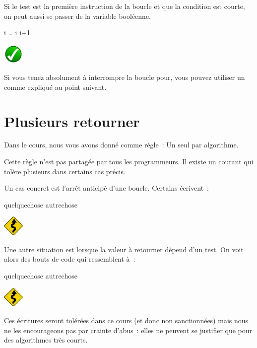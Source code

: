 	\bigskip
	\begin{minipage}{6cm}
	Si le test est la première instruction de la boucle
	et que la condition est courte,
	on peut aussi se passer de la variable booléenne.
	\end{minipage}
	\quad
	\begin{minipage}[t]{7cm}
		\vskip-8mm
		\begin{LDA}
		\Let i 
			\Stmt \dots
			\Let i \Gets i+1
		\EndWhile
		\end{LDA}
	\end{minipage}
	\hskip-5mm
	\includegraphics[width=1cm]{icon/do}

	\medskip
	Si vous tenez absolument à interrompre la boucle \og{}pour\fg{},
	vous pouvez utiliser un  comme expliqué au point suivant.
	 
\section{Plusieurs retourner}
	
	Dans le cours,
	nous vous avons donné comme règle~:
	\og{}Un seul  par algorithme\fg{}.

	Cette règle n’est pas partagée par tous les programmeurs.
	Il existe un courant qui tolère plusieurs \lda{retourner}
	dans certains cas précis.

	\begin{minipage}{7cm}
		Un cas concret est l'arrêt anticipé d'une boucle.
		Certains écrivent~:
	\end{minipage}
	\quad
	\begin{minipage}[t]{6cm}
		\vskip-5mm
		\begin{LDA}
			\For{i}{1}{n}
				\If{\dots}
					\Return quelquechose
				\EndIf
			\EndFor
			\Return autrechose
		\end{LDA}
	\end{minipage}
	\hskip-5mm
	\includegraphics[width=1cm]{icon/caution}
	
	\bigskip
	\begin{minipage}{7cm}
		Une autre situation est lorsque la valeur à retourner dépend d’un test.
		On voit alors des bouts de code qui ressemblent à~:
	\end{minipage}
	\quad
	\begin{minipage}[t]{6cm}
		\vskip-5mm
		\begin{LDA}
			\If{\dots}
				\Return quelquechose
			\Else
				\Return autrechose
			\EndIf
		\end{LDA}
	\end{minipage}
	\hskip-5mm
	\includegraphics[width=1cm]{icon/caution}
	
	\medskip
	Ces écritures seront tolérées dans ce cours
	(et donc non sanctionnées)
	mais nous ne les encourageons pas
	par crainte d’abus~: elles ne peuvent se
	justifier que pour des algorithmes très courts.
	
